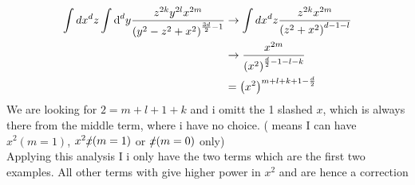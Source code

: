 \begin{align}
	\int dx ^d z\int \text{d} ^d y\frac{z^{2k} y^{2l} x^{2m}}{\left(y^2-z^2+x^2\right)^{\frac{3d}{2}-1}}
	&\rightarrow
	\int dx ^d z \frac{z^{2k} x^{2m}}{\left(z^2+x^2\right)^{d-1-l}}
	\\
	&\rightarrow
	\frac{x^{2m}}{\left(x^2\right)^{\frac{d}{2}-1-l-k}}
	\\
	&=\left(x^2\right)^{m+l+k+1-\frac{d}{2}}
\end{align}
We are looking for $2=m+l+1+k$ and i omitt the 1 slashed $x$, which is always there from the middle term, where i have no choice. ( means I can have $x^2(m=1)$, $x^2 \slashed x(m=1)$ or $\slashed x(m=0)$ only)
\\
Applying this analysis I i only have the two terms which are the first two examples. All other terms with give higher power in $x^2$ and are hence a correction

